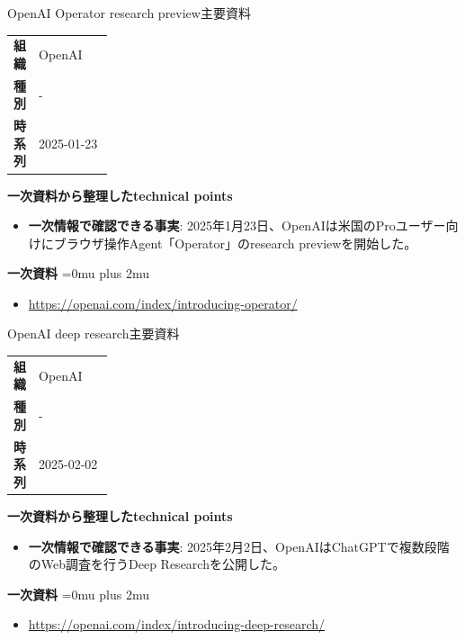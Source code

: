\begin{technicalnote}{OpenAI Operator research preview}{主要資料}
\begingroup
\begin{tabularx}{\linewidth}{@{}>{\bfseries}p{0.22\linewidth}X@{}}
組織 & OpenAI \\
種別 & - \\
時系列 & 2025-01-23 \\
\end{tabularx}
\smallskip
{\bfseries 一次資料から整理したtechnical points}
\begin{itemize}[leftmargin=1.5em,itemsep=0.35em]
\item \textbf{一次情報で確認できる事実}: 2025年1月23日、OpenAIは米国のProユーザー向けにブラウザ操作Agent「Operator」のresearch previewを開始した。
\end{itemize}
\begin{samepage}
{\bfseries 一次資料}
\begingroup\sloppy
\Urlmuskip=0mu plus 2mu\relax
\begin{itemize}[leftmargin=1.5em,itemsep=0.25em]
\item {\scriptsize\url{https://openai.com/index/introducing-operator/}}
\end{itemize}
\endgroup
\end{samepage}
\endgroup
\end{technicalnote}
\medskip

\begin{technicalnote}{OpenAI deep research}{主要資料}
\begingroup
\begin{tabularx}{\linewidth}{@{}>{\bfseries}p{0.22\linewidth}X@{}}
組織 & OpenAI \\
種別 & - \\
時系列 & 2025-02-02 \\
\end{tabularx}
\smallskip
{\bfseries 一次資料から整理したtechnical points}
\begin{itemize}[leftmargin=1.5em,itemsep=0.35em]
\item \textbf{一次情報で確認できる事実}: 2025年2月2日、OpenAIはChatGPTで複数段階のWeb調査を行うDeep Researchを公開した。
\end{itemize}
\begin{samepage}
{\bfseries 一次資料}
\begingroup\sloppy
\Urlmuskip=0mu plus 2mu\relax
\begin{itemize}[leftmargin=1.5em,itemsep=0.25em]
\item {\scriptsize\url{https://openai.com/index/introducing-deep-research/}}
\end{itemize}
\endgroup
\end{samepage}
\endgroup
\end{technicalnote}
\medskip

